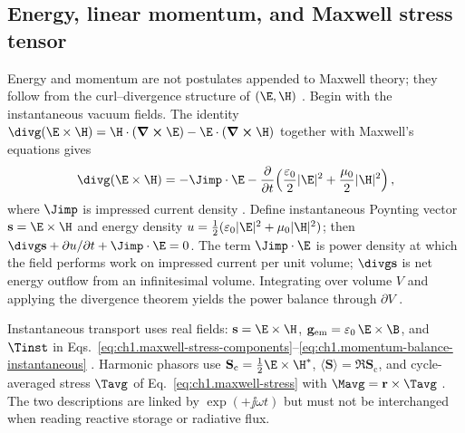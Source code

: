 \subsection{Energy, linear momentum, and Maxwell stress tensor}
\label{sec:ch01.1.4}

Energy and momentum are not postulates appended to Maxwell theory; they follow from
the curl--divergence structure of $(\E,\H)$ \cite{poynting1884,maxwell1873}. Begin with
the instantaneous vacuum fields. The identity
$\divg(\E\times\H)=\H\cdot(\curl\E)-\E\cdot(\curl\H)$ together with Maxwell's equations
gives
\begin{equation}
\label{eq:ch1.poynting-instantaneous}
\divg(\E\times\H)
=-\Jimp\cdot\E
-\frac{\partial}{\partial t}\!\left(\frac{\varepsilon_0}{2}|\E|^2+\frac{\mu_0}{2}|\H|^2\right),
\end{equation}
where $\Jimp$ is impressed current density \cite{stratton1941}. Define instantaneous
Poynting vector $\mathbf{s}=\E\times\H$ and energy density
$u=\tfrac12(\varepsilon_0|\E|^2+\mu_0|\H|^2)$; then
$\divg\mathbf{s}+\partial u/\partial t+\Jimp\cdot\E=0$. The term $\Jimp\cdot\E$ is
power density at which the field performs work on impressed current per unit volume; $\divg\mathbf{s}$ is net energy
outflow from an infinitesimal volume. Integrating over volume $V$ and applying the
divergence theorem yields the power balance through $\partial V$ \cite{poynting1884}.

Instantaneous transport uses real fields: $\mathbf{s}=\E\times\H$, $\mathbf{g}_{\mathrm{em}}=\varepsilon_0\,\E\times\B$, and $\Tinst$ in Eqs.~\eqref{eq:ch1.maxwell-stress-components}--\eqref{eq:ch1.momentum-balance-instantaneous} \cite{maxwell1873,poynting1884}. Harmonic phasors use $\mathbf{S}_\mathrm{c}=\tfrac12\E\times\H^*$, $\langle\mathbf{S}\rangle=\Re\mathbf{S}_\mathrm{c}$, and cycle-averaged stress $\Tavg$ of Eq.~\eqref{eq:ch1.maxwell-stress} with $\Mavg=\mathbf{r}\times\Tavg$ \cite{stratton1941}. The two descriptions are linked by $\exp(+\jj\omega t)$ but must not be interchanged when reading reactive storage or radiative flux.

